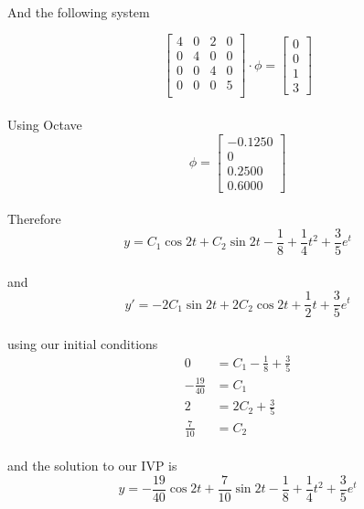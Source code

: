 \documentclass{article}
\begin{document}
\paragraph{}And the following system

\[
  \begin{bmatrix}
    4 & 0 & 2 & 0\\
    0 & 4 & 0 & 0\\
    0 & 0 & 4 & 0\\
    0 & 0 & 0 & 5\\
  \end{bmatrix}
  \cdot \phi
  = 
  \begin{bmatrix}
    0\\0\\1\\3
  \end{bmatrix}
\]
\paragraph{}Using Octave
\[
  \phi =
  \begin{bmatrix}
    -0.1250\\
        0\\
   0.2500\\
   0.6000
  \end{bmatrix}
\]
\paragraph{}Therefore
\[
    y = C_1 \cos2t + C_2 \sin 2t -\frac{1}{8} + \frac{1}{4}t^2 + \frac{3}{5}e^t
\]
\paragraph{}and
\[
    y' = -2 C_1 \sin2t + 2 C_2 \cos 2t +\frac{1}{2}t + \frac{3}{5}e^t
\]
\paragraph{}using our initial conditions
\begin{align*}
    0 &= C_1  - \frac{1}{8} + \frac{3}{5}\\
    -\frac{19}{40} &= C_1\\
    2 &= 2C_2 + \frac{3}{5}\\
    \frac{7}{10} &= C_2
\end{align*}
\paragraph{}and the solution to our IVP is
\[
    y = -\frac{19}{40}\cos2t + \frac{7}{10}\sin 2t -\frac{1}{8} + \frac{1}{4}t^2 + \frac{3}{5}e^t
\]
\end{document}
